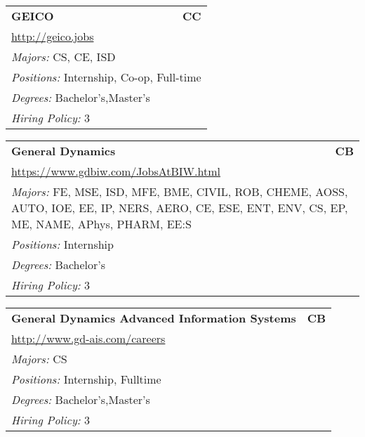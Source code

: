 \documentclass[twoside]{article}
\begin{document}
\begin{center}
\begin{multicols}{3}
\begin{FlushLeft}
\begin{minipage}{\columnwidth}
\end{minipage}
 
\begin{minipage}{\columnwidth}\begin{tabularx}{.95\columnwidth}{Xr}
                 {\Large\bf GEICO} & {\Large\bf CC}\\
    \multicolumn{2}{p{.95\columnwidth}}{\url{http://geico.jobs}}\\
    \multicolumn{2}{p{.95\columnwidth}}{\emph{Majors:} CS, CE, ISD}\\
    \multicolumn{2}{p{.95\columnwidth}}{\emph{Positions:} Internship, Co-op, Full-time}\\
    \multicolumn{2}{p{.95\columnwidth}}{\emph{Degrees:} Bachelor's,Master's}\\
    \multicolumn{2}{p{.95\columnwidth}}{\emph{Hiring Policy:} 3}\\
    \end{tabularx}
    
\end{minipage}
 
\begin{minipage}{\columnwidth}\begin{tabularx}{.95\columnwidth}{Xr}
                 {\Large\bf General Dynamics} & {\Large\bf CB}\\
    \multicolumn{2}{p{.95\columnwidth}}{\url{https://www.gdbiw.com/JobsAtBIW.html}}\\
    \multicolumn{2}{p{.95\columnwidth}}{\emph{Majors:} FE, MSE, ISD, MFE, BME, CIVIL, ROB, CHEME, AOSS, AUTO, IOE, EE, IP, NERS, AERO, CE, ESE, ENT, ENV, CS, EP, ME, NAME, APhys, PHARM, EE:S}\\
    \multicolumn{2}{p{.95\columnwidth}}{\emph{Positions:} Internship}\\
    \multicolumn{2}{p{.95\columnwidth}}{\emph{Degrees:} Bachelor's}\\
    \multicolumn{2}{p{.95\columnwidth}}{\emph{Hiring Policy:} 3}\\
    \end{tabularx}
    
\end{minipage}
 
\begin{minipage}{\columnwidth}\begin{tabularx}{.95\columnwidth}{Xr}
                 {\Large\bf General Dynamics Advanced Information Systems} & {\Large\bf CB}\\
    \multicolumn{2}{p{.95\columnwidth}}{\url{http://www.gd-ais.com/careers}}\\
    \multicolumn{2}{p{.95\columnwidth}}{\emph{Majors:} CS}\\
    \multicolumn{2}{p{.95\columnwidth}}{\emph{Positions:} Internship,  Fulltime}\\
    \multicolumn{2}{p{.95\columnwidth}}{\emph{Degrees:} Bachelor's,Master's}\\
    \multicolumn{2}{p{.95\columnwidth}}{\emph{Hiring Policy:} 3}\\
    \end{tabularx}
    

\end{minipage}
\end{FlushLeft}
\end{multicols}
\end{center}
\end{document}
